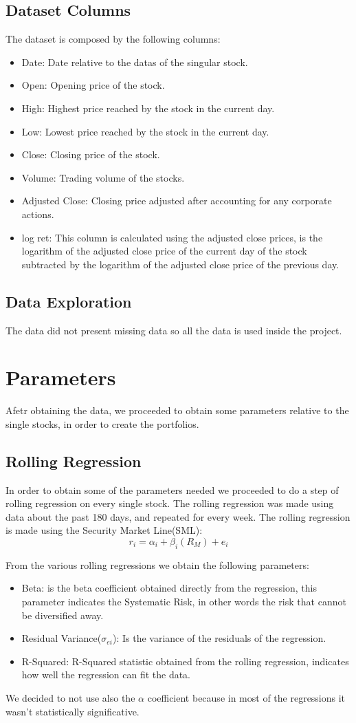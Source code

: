 \documentclass[12pt, a4paper, twocolumn]{article} %
\begin{document}
	\subsection{Dataset Columns}
	The dataset is composed by the following columns:
	\begin{itemize}
		\item Date: Date relative to the datas of the singular stock.
		\item Open: Opening price of the stock.
		\item High: Highest price reached by the stock in the current day.
		\item Low: Lowest price reached by the stock in the current day.
		\item Close: Closing price of the stock.
		\item Volume: Trading volume of the stocks.
		\item Adjusted Close: Closing price adjusted after accounting for any corporate actions.
		\item log ret: This column is calculated using the adjusted close prices, is the logarithm of the adjusted close price of the current day of the stock subtracted by the logarithm of the adjusted close price of the previous day.
	\end{itemize}
	
	\subsection{Data Exploration}
	The data did not present missing data so all the data is used inside the project.
	
	\section{Parameters}
	Afetr obtaining the data, we proceeded to obtain some parameters relative to the single stocks, in order to create the portfolios.
	\subsection{Rolling Regression}
	In order to obtain some of the parameters needed we proceeded to do a step of rolling regression on every single stock. The rolling regression was made using data about the past 180 days, and repeated for every week.
	The rolling regression is made using the Security Market Line(SML):
	\[
		r_i = \alpha_i +\beta_i(R_M)+e_i
	\]
	
	From the various rolling regressions we obtain the following parameters:
	\begin{itemize}
		\item Beta: is the beta coefficient obtained directly from the regression, this parameter indicates the Systematic Risk, in other words the risk that cannot be diversified away.
		\item Residual Variance($\sigma_{ei}$): Is the variance of the residuals of the regression.
		\item R-Squared: R-Squared statistic obtained from the rolling regression, indicates how well the regression can fit the data.
	\end{itemize}
	We decided to not use also the $\alpha$ coefficient because in most of the regressions it wasn't statistically significative.
\end{document}

